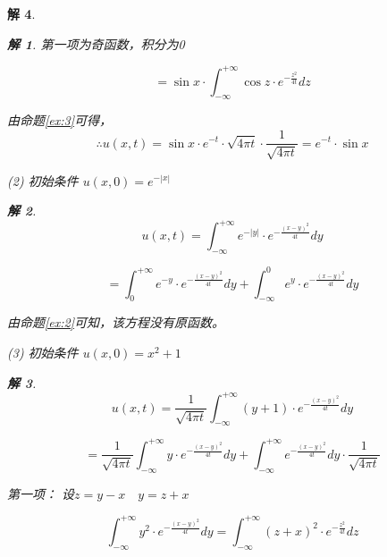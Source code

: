 \documentclass[12pt,a4paper]{article}
\newtheorem*{solution}{解}
\begin{document}
\begin{solution}
\begin{solution}
	第一项为奇函数，积分为0
		
		\begin{equation*}
			=  \sin x \cdot \int_{-\infty}^{+\infty} \cos z \cdot e^{-\frac{z^2}{4t}} dz
		\end{equation*}
		
		由命题\eqref{ex:3}可得，
\begin{equation*}
	\therefore u(x,t) = \sin x \cdot e^{-t} \cdot \sqrt{4\pi t} \cdot \frac{1}{\sqrt{4\pi t}} = e^{-t} \cdot \sin x
\end{equation*}

	\end{solution}


	
(2) 初始条件 \( u(x,0) = e^{-|x|} \)
		\begin{solution}
	
	\begin{equation*}
	u(x,t)=	\int_{-\infty}^{+\infty} e^{-|y|} \cdot e^{-\frac{(x-y)^2}{4t}} dy
	\end{equation*}
	
	\begin{equation*}
		= \int_{0}^{+\infty} e^{-y} \cdot e^{-\frac{(x-y)^2}{4t}} dy + \int_{-\infty}^{0} e^{y} \cdot e^{-\frac{(x-y)^2}{4t}} dy
	\end{equation*}
	
	由命题\eqref{ex:2}可知，该方程没有原函数。
	
		\end{solution}
	
	
(3) 初始条件 \( u(x,0) = x^2 + 1 \)
			\begin{solution}
	
\begin{equation*}
 u(x,t)=\frac{1}{\sqrt{4\pi t}}\int_{-\infty}^{+\infty}(y+1)\cdot e^{-\frac{(x-y)^2}{4t}}dy
\end{equation*}

\begin{equation*}
	=\frac{1}{\sqrt{4\pi t}}\int_{-\infty}^{+\infty} y\cdot e^{-\frac{(x-y)^2}{4t}}dy+\int_{-\infty}^{+\infty} e^{-\frac{(x-y)^2}{4t}}dy\cdot \frac{1}{\sqrt{4\pi t}}
\end{equation*}

第一项：
设$z=y-x\quad y=z+x$



\begin{equation*}
	\int_{-\infty}^{+\infty} y^2 \cdot e^{-\frac{(x-y)^2}{4t}} dy	=\int_{-\infty}^{+\infty}(z+x)^2 \cdot e^{-\frac{z^2}{4t}} dz
\end{equation*}



\end{solution}
\end{solution}
\end{document}
